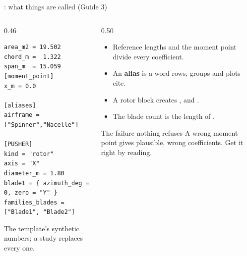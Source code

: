 \begin{frame}[fragile]{: what things are called (Guide 3)}
\begin{columns}[T]
\begin{column}{0.46\textwidth}
\begin{lstlisting}[style=ftsbase]
area_m2 = 19.502
chord_m =  1.322
span_m  = 15.059
[moment_point]
x_m = 0.0

[aliases]
airframe = ["Spinner","Nacelle"]

[PUSHER]
kind = "rotor"
axis = "X"
diameter_m = 1.80
blade1 = { azimuth_deg = 0, zero = "Y" }
families_blades = ["Blade1", "Blade2"]
\end{lstlisting}
{\tiny\color{SoftGray} The template's synthetic numbers; a study replaces every one.}
\end{column}
\begin{column}{0.50\textwidth}
\begin{itemize}\small
  \item Reference lengths and the moment point divide every coefficient.
  \item An \textbf{alias} is a word rows, groups and plots cite.
  \item A rotor block creates ,  and
        .
  \item The blade count is the length of .
\end{itemize}
\begin{alertblock}{The failure nothing refuses}
A wrong moment point gives plausible, wrong coefficients. Get it right by
reading.
\end{alertblock}
\end{column}
\end{columns}
\end{frame}

